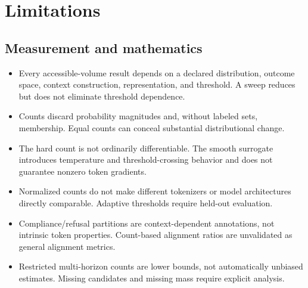 \section{Limitations}
\subsection{Measurement and mathematics}
\begin{itemize}
  \item Every accessible-volume result depends on a declared distribution, outcome space, context construction, representation, and threshold. A sweep reduces but does not eliminate threshold dependence.
  \item Counts discard probability magnitudes and, without labeled sets, membership. Equal counts can conceal substantial distributional change.
  \item The hard count is not ordinarily differentiable. The smooth surrogate introduces temperature and threshold-crossing behavior and does not guarantee nonzero token gradients.
  \item Normalized counts do not make different tokenizers or model architectures directly comparable. Adaptive thresholds require held-out evaluation.
  \item Compliance/refusal partitions are context-dependent annotations, not intrinsic token properties. Count-based alignment ratios are unvalidated as general alignment metrics.
  \item Restricted multi-horizon counts are lower bounds, not automatically unbiased estimates. Missing candidates and missing mass require explicit analysis.
\end{itemize}

